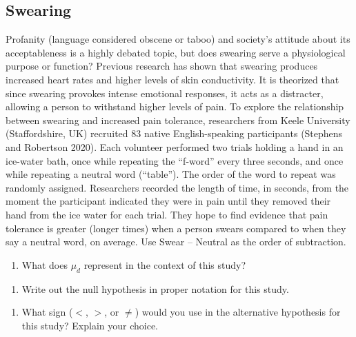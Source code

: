 \documentclass[
]{report}
\providecommand{\tightlist}{%
  \setlength{\itemsep}{0pt}\setlength{\parskip}{0pt}}
\begin{document}
\hypertarget{swearing}{%
\subsection{Swearing}\label{swearing}}

Profanity (language considered obscene or taboo) and society's attitude about its acceptableness is a highly debated topic, but does swearing serve a physiological purpose or function? Previous research has shown that swearing produces increased heart rates and higher levels of skin conductivity. It is theorized that since swearing provokes intense emotional responses, it acts as a distracter, allowing a person to withstand higher levels of pain. To explore the relationship between swearing and increased pain tolerance, researchers from Keele University (Staffordshire, UK) recruited 83 native English-speaking participants (Stephens and Robertson 2020). Each volunteer performed two trials holding a hand in an ice-water bath, once while repeating the ``f-word'' every three seconds, and once while repeating a neutral word (``table''). The order of the word to repeat was randomly assigned. Researchers recorded the length of time, in seconds, from the moment the participant indicated they were in pain until they removed their hand from the ice water for each trial. They hope to find evidence that pain tolerance is greater (longer times) when a person swears compared to when they say a neutral word, on average. Use Swear -- Neutral as the order of subtraction.

\begin{enumerate}
\def\labelenumi{\arabic{enumi}.}
\setcounter{enumi}{3}
\tightlist
\item
  What does \(\mu_d\) represent in the context of this study?
\end{enumerate}

\vspace{0.8in}

\begin{enumerate}
\def\labelenumi{\arabic{enumi}.}
\setcounter{enumi}{4}
\tightlist
\item
  Write out the null hypothesis in proper notation for this study.
\end{enumerate}

\vspace{0.8in}

\begin{enumerate}
\def\labelenumi{\arabic{enumi}.}
\setcounter{enumi}{5}
\tightlist
\item
  What sign (\(<\), \(>\), or \(\neq\)) would you use in the alternative hypothesis for this study? Explain your choice.
\end{enumerate}
\end{document}
